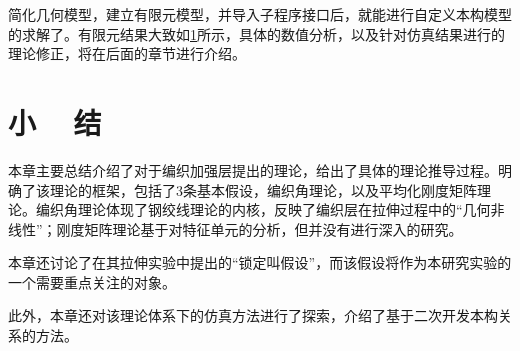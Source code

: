 简化几何模型，建立有限元模型，并导入\uma 子程序接口后，\aba 就能进行自定义本构模型的求解了。有限元结果大致如\ref{fig:results-2}所示，具体的数值分析，以及针对仿真结果进行的理论修正，将在后面的章节进行介绍。
\begin{figure}[!htp]
\centering
{}
\hspace{0.5cm}
\label{fig:results-2}
\end{figure}


\section{小 ~ 结}

本章主要总结介绍了\ha 对于编织加强层提出的理论，给出了具体的理论推导过程。明确了该理论的框架，包括了3条基本假设，编织角理论，以及平均化刚度矩阵理论。编织角理论体现了钢绞线理论的内核，反映了编织层在拉伸过程中的“几何非线性”；刚度矩阵理论基于对特征单元的分析，但\ha 并没有进行深入的研究。

本章还讨论了\ha 在其拉伸实验中提出的“锁定叫假设”，而该假设将作为本研究实验的一个需要重点关注的对象。

此外，本章还对该理论体系下的仿真方法进行了探索，介绍了基于\uma 二次开发本构关系的方法。



